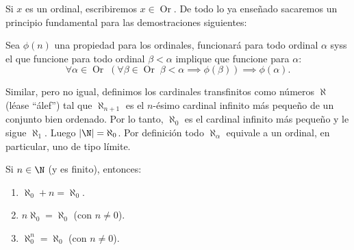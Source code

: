 \documentclass[11pt,oneside,a4paper]{book}
\DeclareMathOperator{\Or}{Or}
\begin{document}
Si $x$ es un ordinal, escribiremos $x\in\Or$. De todo lo ya enseñado sacaremos un principio fundamental para las demostraciones siguientes:
\begin{thm}
Sea $\phi(n)$ una propiedad para los ordinales, funcionará para todo ordinal $\alpha$ syss el que funcione para todo ordinal $\beta\lt\alpha$ implique que funcione para $\alpha$:
\begin{equation}
\forall\alpha\in\Or\;\left(\forall\beta\in\Or\;\beta\lt\alpha\implies\phi(\beta)\right)\implies\phi(\alpha).
\end{equation}
\end{thm}

Similar, pero no igual, definimos los cardinales transfinitos como números $\aleph$ (léase ``álef'') tal que $\aleph_{n+1}$ es el $n$-ésimo cardinal infinito más pequeño de un conjunto bien ordenado. Por lo tanto, $\aleph_0$ es el cardinal infinito más pequeño y le sigue $\aleph_1$. Luego $|\N|=\aleph_0$. Por definición todo $\aleph_\alpha$ equivale a un ordinal, en particular, uno de tipo límite.
\begin{thm}
Si $n\in\N$ (y es finito), entonces:
\begin{enumerate}[$a$)]
\item $\aleph_0+n=\aleph_0$.
\item $n\aleph_0=\aleph_0$ (con $n\neq 0$).
\item $\aleph_0^n=\aleph_0$ (con $n\neq 0$).
\end{enumerate}
\end{thm}
\end{document}
